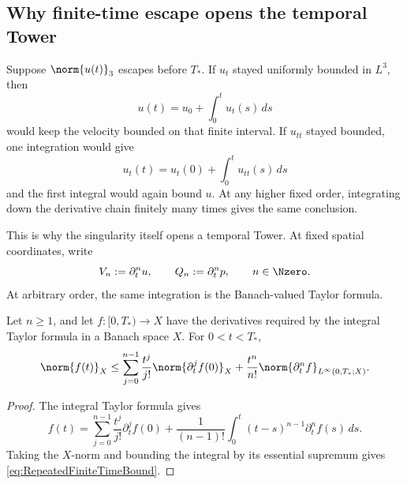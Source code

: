 \subsection{Why finite-time escape opens the temporal Tower}\label{sub:BodyFiniteTimeResponseEscalation}

Suppose \(\norm{u(t)}_3\) escapes before \(T_*\).
If \(u_t\) stayed uniformly bounded in \(L^3\), then
\[
  u(t)=u_0+\int_0^t u_t(s)\,ds
\]
would keep the velocity bounded on that finite interval.
If \(u_{tt}\) stayed bounded, one integration would give
\[
  u_t(t)=u_t(0)+\int_0^t u_{tt}(s)\,ds
\]
and the first integral would again bound \(u\).
At any higher fixed order, integrating down the derivative chain finitely many times gives the same conclusion.

This is why the singularity itself opens a temporal Tower.
At fixed spatial coordinates, write
\begin{equation}\label{eq:TemporalTowerDefinitionBody}
  V_n:=\partial_t^nu,
  \qquad
  Q_n:=\partial_t^np,
  \qquad n\in\Nzero.
\end{equation}
At arbitrary order, the same integration is the Banach-valued Taylor formula.

\begin{lemma}\label{lem:RepeatedFiniteTimeIntegration}
Let \(n\geq1\), and let \(f:[0,T_*)\to X\) have the derivatives required by the integral Taylor formula in a Banach space \(X\).
For \(0<t<T_*\),
\begin{equation}\label{eq:RepeatedFiniteTimeBound}
  \norm{f(t)}_X
  \leq
  \sum_{j=0}^{n-1}\frac{t^j}{j!}\norm{\partial_t^jf(0)}_X
  +\frac{t^n}{n!}\norm{\partial_t^nf}_{L^\infty(0,T_*;X)}.
\end{equation}
\end{lemma}

\begin{proof}
The integral Taylor formula gives
\[
  f(t)
  =\sum_{j=0}^{n-1}\frac{t^j}{j!}\partial_t^jf(0)
  +\frac1{(n-1)!}\int_0^t(t-s)^{n-1}\partial_t^nf(s)\,ds.
\]
Taking the \(X\)-norm and bounding the integral by its essential supremum gives \eqref{eq:RepeatedFiniteTimeBound}.
\end{proof}

